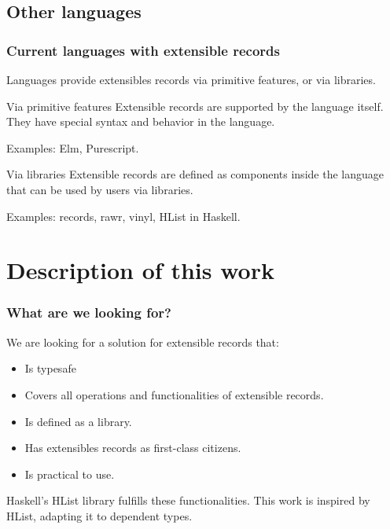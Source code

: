 \documentclass{beamer}
\begin{document}
\subsection{Other languages}

\begin{frame}
\frametitle{Current languages with extensible records}

Languages provide extensibles records via primitive features, or via libraries.

\pause

\begin{block}{Via primitive features}
Extensible records are supported by the language itself. They have special syntax and behavior in the language.

Examples: Elm, Purescript.
\end{block}

\pause

\begin{block}{Via libraries}
Extensible records are defined as components inside the language that can be used by users via libraries.

Examples: records, rawr, vinyl, HList in Haskell.
\end{block}

\end{frame}

\section{Description of this work}

\begin{frame}
\frametitle{What are we looking for?}

We are looking for a solution for extensible records that:

\begin{itemize}
\item Is typesafe
\item Covers all operations and functionalities of extensible records.
\item Is defined as a library.
\item Has extensibles records as first-class citizens.
\item Is practical to use.
\end{itemize}

\pause

Haskell's HList library fulfills these functionalities. This work is inspired by HList, adapting it to dependent types.

\end{frame}
\end{document}
